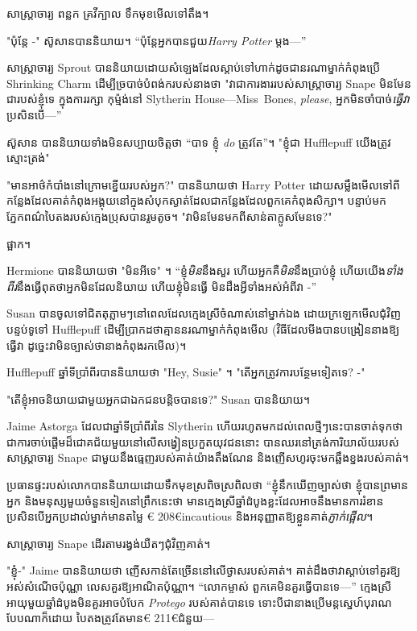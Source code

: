 {{{{{{{{សាស្ត្រាចារ្យ ពន្លក គ្រវីក្បាល ទឹកមុខមើលទៅតឹង។

"ប៉ុន្តែ -" ស៊ូសានបាននិយាយ។ “ប៉ុន្តែអ្នកបានជួយ\emph{Harry Potter} ម្តង—”

សាស្ត្រាចារ្យ Sprout បាននិយាយដោយសំឡេងដែលស្តាប់ទៅហាក់ដូចជានរណាម្នាក់កំពុងប្រើ Shrinking Charm ដើម្បីច្របាច់បំពង់ករបស់នាងថា "វាជាការងាររបស់សាស្រ្តាចារ្យ Snape មិនមែនជារបស់ខ្ញុំទេ ក្នុងការរក្សា កុម្ម៉ង់នៅ Slytherin House—Miss~Bones, \emph{please}, អ្នកមិនចាំបាច់\emph{ធ្វើវា}ប្រសិនបើ—”

ស៊ូសាន បាននិយាយទាំងមិនសប្បាយចិត្តថា “បាទ ខ្ញុំ \emph{do} ត្រូវតែ”។ "ខ្ញុំជា Hufflepuff យើងត្រូវស្មោះត្រង់"

\later

"មានអាថ៌កំបាំងនៅក្រោមខ្នើយរបស់អ្នក?" បាននិយាយថា Harry Potter ដោយសម្លឹងមើលទៅពីកន្លែងដែលគាត់កំពុងអង្គុយនៅក្នុងសំបុកស្ងាត់ដែលជាកន្លែងដែលពួកគេកំពុងសិក្សា។ បន្ទាប់មកភ្នែកពណ៌បៃតងរបស់ក្មេងប្រុសបានរួមតូច។ "វាមិនមែនមកពីសាន់តាក្លូសមែនទេ?"

ផ្អាក។

Hermione បាននិយាយថា "មិនអីទេ" ។ “ខ្ញុំ\emph{មិន}នឹងសួរ ហើយអ្នកគឺ\emph{មិន}នឹងប្រាប់ខ្ញុំ ហើយយើង\emph{ទាំងពីរ}នឹងធ្វើពុតថាអ្នកមិនដែលនិយាយ ហើយខ្ញុំមិនធ្វើ មិនដឹងអ្វីទាំងអស់អំពីវា -”

\later

Susan បានចូលទៅជិតតុភ្លាមៗនៅពេលដែលក្មេងស្រីចំណាស់នៅម្នាក់ឯង ដោយក្រឡេកមើលជុំវិញបន្ទប់ទូទៅ Hufflepuff ដើម្បីប្រាកដថាគ្មាននរណាម្នាក់កំពុងមើល (វិធីដែលមីងបានបង្រៀននាងឱ្យធ្វើវា ដូច្នេះវាមិនច្បាស់ថានាងកំពុងរកមើល)។

Hufflepuff ឆ្នាំទីប្រាំពីរបាននិយាយថា "Hey, Susie" ។ "តើអ្នកត្រូវការបន្ថែមទៀតទេ? -"

"តើខ្ញុំអាចនិយាយជាមួយអ្នកជាឯកជនបន្តិចបានទេ?" Susan បាននិយាយ។

\later

Jaime Astorga ដែលជាឆ្នាំទីប្រាំពីរនៃ Slytherin ហើយរហូតមកដល់ពេលថ្មីៗនេះបានចាត់ទុកថាជាការចាប់ផ្តើមដ៏ជោគជ័យមួយនៅលើសង្វៀនប្រកួតយុវជននោះ បានឈរនៅត្រង់ការិយាល័យរបស់សាស្រ្តាចារ្យ Snape ជាមួយនឹងធ្មេញរបស់គាត់យ៉ាងតឹងណែន និងញើសហូរចុះមកឆ្អឹងខ្នងរបស់គាត់។

ប្រធាន​ផ្ទះ​របស់​លោក​បាន​និយាយ​ដោយ​ទឹក​មុខ​ស្រពិចស្រពិល​ថា “ខ្ញុំ​នឹក​ឃើញ​ច្បាស់​ថា ខ្ញុំ​បាន​ព្រមាន​អ្នក និង​មនុស្ស​មួយ​ចំនួន​ទៀត​នៅ​ព្រឹក​នេះ​ថា មាន​ក្មេង​ស្រី​ឆ្នាំ​ដំបូង​ខ្លះ​ដែល​អាច​នឹង​មាន​ការ​រំខាន ប្រសិន​បើ​អ្នក​ប្រដាល់​ម្នាក់​មាន​តម្លៃ € 208€{incautious} និងអនុញ្ញាតឱ្យខ្លួនគាត់\emph{ភ្ញាក់ផ្អើល}។

សាស្រ្តាចារ្យ Snape ដើរតាមរង្វង់យឺតៗជុំវិញគាត់។

"ខ្ញុំ-" Jaime បាននិយាយថា ញើសកាន់តែច្រើននៅលើថ្ងាសរបស់គាត់។ គាត់ដឹងថាវាស្តាប់ទៅគួរឱ្យអស់សំណើចប៉ុណ្ណា លេសគួរឱ្យអាណិតប៉ុណ្ណា។ “លោកម្ចាស់ ពួកគេមិនគួរធ្វើបានទេ—” ក្មេងស្រីអាយុមួយឆ្នាំដំបូងមិនគួរអាចបំបែក \emph{Protego} របស់គាត់បានទេ ទោះបីជានាងប្រើមន្តស្នេហ៍បុរាណបែបណាក៏ដោយ បៃតងត្រូវតែមាន€ 211€{ជំនួយ}—

}}}}}}}}
